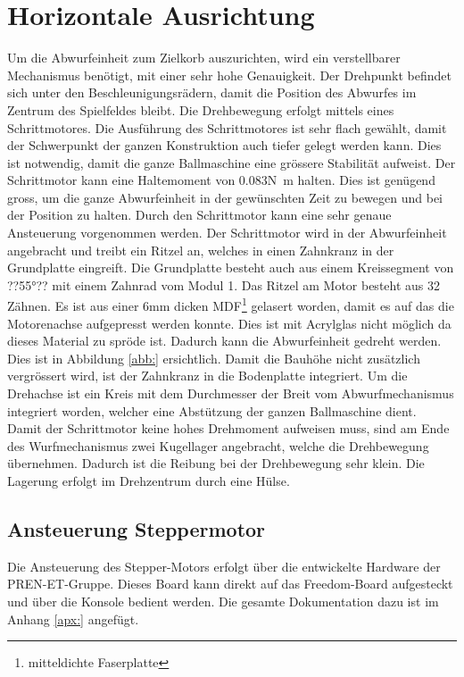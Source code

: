 \section{Horizontale Ausrichtung}
    Um die Abwurfeinheit zum Zielkorb auszurichten, wird ein verstellbarer Mechanismus benötigt, 
    mit einer sehr hohe Genauigkeit. Der Drehpunkt befindet sich unter den Beschleunigungsrädern, 
    damit die Position des Abwurfes im Zentrum des Spielfeldes bleibt. Die Drehbewegung erfolgt 
    mittels eines Schrittmotores. Die Ausführung des Schrittmotores ist sehr flach gewählt, damit 
    der Schwerpunkt der ganzen Konstruktion auch tiefer gelegt werden kann. Dies ist notwendig, 
    damit die ganze Ballmaschine eine grössere Stabilität aufweist. Der Schrittmotor kann eine 
    Haltemoment von 0.083\si{\newton\meter} halten. Dies ist genügend gross, um die ganze 
    Abwurfeinheit in der gewünschten Zeit zu bewegen und bei der Position zu halten. Durch den 
    Schrittmotor kann eine sehr genaue Ansteuerung vorgenommen werden. Der Schrittmotor wird in der Abwurfeinheit angebracht und treibt ein Ritzel an, welches in einen Zahnkranz in der Grundplatte 
    eingreift. Die Grundplatte besteht auch aus einem Kreissegment von ??55\si{\degree}?? 
    mit einem Zahnrad vom Modul 1. Das Ritzel am Motor besteht aus 32 Zähnen. Es ist aus einer 
    6\si{\milli\meter} dicken MDF\footnote{mitteldichte Faserplatte} gelasert worden, damit es auf 
    das die Motorenachse aufgepresst werden konnte. Dies ist mit Acrylglas nicht möglich da dieses 
    Material zu spröde ist. Dadurch kann die Abwurfeinheit gedreht werden. Dies ist in Abbildung 
    \ref{abb:} ersichtlich. Damit die Bauhöhe nicht zusätzlich 
    vergrössert wird, ist der Zahnkranz in die Bodenplatte integriert. Um die Drehachse ist ein Kreis 
    mit dem Durchmesser der Breit vom Abwurfmechanismus integriert worden, welcher eine Abstützung 
    der ganzen Ballmaschine dient.\\
    Damit der Schrittmotor keine hohes Drehmoment aufweisen muss, sind am Ende des Wurfmechanismus 
    zwei Kugellager angebracht, welche die Drehbewegung übernehmen. Dadurch ist die Reibung bei der 
    Drehbewegung sehr klein. Die Lagerung erfolgt im Drehzentrum durch eine Hülse.


     \subsection{Ansteuerung Steppermotor}
        Die Ansteuerung des Stepper-Motors erfolgt über die entwickelte Hardware der PREN-ET-Gruppe. 
        Dieses Board kann direkt auf das Freedom-Board aufgesteckt und über die Konsole bedient 
        werden. Die gesamte Dokumentation dazu ist im Anhang \ref{apx:} angefügt. 
        
